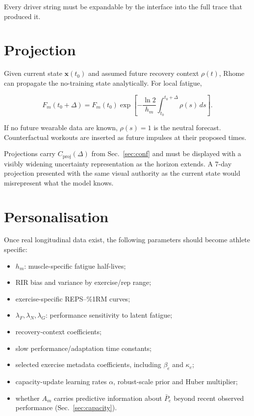 \documentclass[11pt]{article}
\begin{document}
Every driver string must be expandable by the interface into the full trace that produced it.

\section{Projection}

Given current state $\mathbf{x}(t_0)$ and assumed future recovery context $\rho(t)$, Rhome can propagate the no-training state analytically. For local fatigue,

\begin{equation}
F_m(t_0+\Delta)=F_m(t_0)
\exp\left[-\frac{\ln2}{h_m}\int_{t_0}^{t_0+\Delta}\rho(s)\,ds\right].
\end{equation}

If no future wearable data are known, $\rho(s)=1$ is the neutral forecast. Counterfactual workouts are inserted as future impulses at their proposed times.

Projections carry $C_{\mathrm{proj}}(\Delta)$ from Sec.~\ref{sec:conf} and must be displayed with a visibly widening uncertainty representation as the horizon extends. A 7-day projection presented with the same visual authority as the current state would misrepresent what the model knows.

\section{Personalisation}

Once real longitudinal data exist, the following parameters should become athlete specific:

\begin{itemize}
    \item $h_m$: muscle-specific fatigue half-lives;
    \item RIR bias and variance by exercise/rep range;
    \item exercise-specific REPS--\%1RM curves;
    \item $\lambda_F,\lambda_N,\lambda_G$: performance sensitivity to latent fatigue;
    \item recovery-context coefficients;
    \item slow performance/adaptation time constants;
    \item selected exercise metadata coefficients, including $\beta_e$ and $\kappa_e$;
    \item capacity-update learning rates $\alpha$, robust-scale prior and Huber multiplier;
    \item whether $A_m$ carries predictive information about $\bar P_e$ beyond recent observed performance (Sec.~\ref{sec:capacity}).
\end{itemize}
\end{document}
